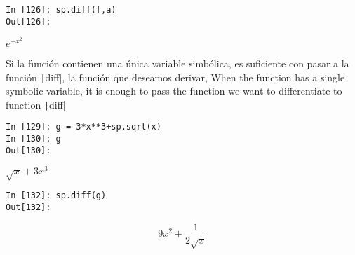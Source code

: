 \begin{center}
	\begin{minipage}{.5\textwidth}
		\begin{verbatim}
In [126]: sp.diff(f,a)
Out[126]: 
		\end{verbatim}
		$e^{-x^2}$
	\end{minipage}
\end{center}

\begin{paracol}{2}
Si la función contienen una única variable simbólica, es suficiente con pasar a la función \texttt|diff|, la función que deseamos derivar,
\switchcolumn
When the function has a single symbolic variable, it is enough to pass the function we want to differentiate to function \texttt|diff| 
\end{paracol}

\begin{center}
	\begin{minipage}{.5\textwidth}
		\begin{verbatim}
In [129]: g = 3*x**3+sp.sqrt(x)
In [130]: g
Out[130]: 
		\end{verbatim}
		$\sqrt{x}+3x^3$
		\begin{verbatim}
In [132]: sp.diff(g)
Out[132]: 
		\end{verbatim}
		\begin{equation*}
			9x^2+\frac{1}{2\sqrt{x}}
		\end{equation*}
	\end{minipage}
\end{center}

